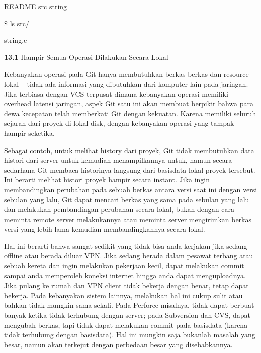 \noindent 
README src string \par
\vspace{12pt}
 $  \$  $ ls src/ \par
\noindent 
string.c \par
\vspace{12pt}
\noindent 
\textbf{13.1 }{Hampir Semua Operasi Dilakukan Secara Lokal}
 \par
Kebanyakan operasi pada Git hanya membutuhkan berkas-berkas dan resource lokal – tidak ada informasi yang dibutuhkan dari komputer lain pada jaringan. Jika terbiasa dengan VCS terpusat dimana kebanyakan operasi memiliki overhead latensi jaringan, aspek Git satu ini akan membuat berpikir bahwa para dewa kecepatan telah memberkati Git dengan kekuatan. Karena memiliki seluruh sejarah dari proyek di lokal disk, dengan kebanyakan operasi yang tampak hampir seketika. \par
Sebagai contoh, untuk melihat history dari proyek, Git tidak membutuhkan data histori dari server untuk kemudian menampilkannya untuk, namun secara sedarhana Git membaca historinya langsung dari basisdata lokal proyek tersebut. Ini berarti melihat histori proyek hampir secara instant. Jika ingin membandingkan perubahan pada sebuah berkas antara versi saat ini dengan versi sebulan yang lalu, Git dapat mencari berkas yang sama pada sebulan yang lalu dan melakukan pembandingan perubahan secara lokal, bukan dengan cara meminta remote server melakukannya atau meminta server mengirimkan berkas versi yang lebih lama kemudian membandingkannya secara lokal. \par
Hal ini berarti bahwa sangat sedikit yang tidak bisa anda kerjakan jika sedang offline atau berada diluar VPN. Jika sedang berada dalam pesawat terbang atau sebuah kereta dan ingin melakukan pekerjaan kecil, dapat melakukan commit sampai anda memperoleh koneksi internet hingga anda dapat menguploadnya. Jika pulang ke rumah dan VPN client tidak bekerja dengan benar, tetap dapat bekerja. Pada kebanyakan sistem lainnya, melakukan hal ini cukup sulit atau bahkan tidak mungkin sama sekali. Pada Perforce misalnya, tidak dapat berbuat banyak ketika tidak terhubung dengan server; pada Subversion dan CVS,  dapat mengubah berkas, tapi tidak dapat melakukan commit pada basisdata (karena tidak terhubung dengan basisdata). Hal ini mungkin saja bukanlah masalah yang besar, namun akan terkejut dengan perbedaan besar yang disebabkannya. \par
\vspace{12pt}
\noindent 
